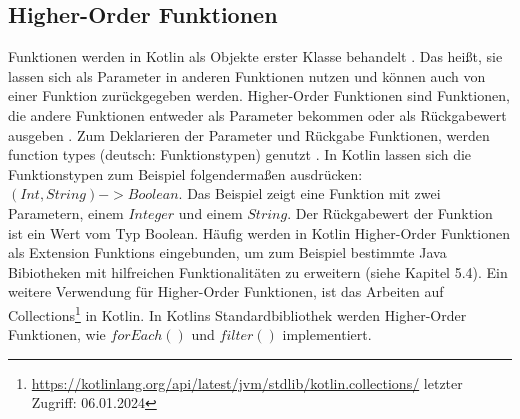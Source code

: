 \documentclass{article}
\begin{document}
\subsection{Higher-Order Funktionen}
Funktionen werden in Kotlin als Objekte erster Klasse behandelt \cite{KotlinLangDocHigherOrder}. Das heißt, sie lassen sich als Parameter in anderen Funktionen nutzen und können auch von einer Funktion zurückgegeben werden. Higher-Order Funktionen sind Funktionen, die andere Funktionen entweder als Parameter bekommen oder als Rückgabewert ausgeben \cite{KotlinLangDocHigherOrder}. Zum Deklarieren der Parameter und Rückgabe Funktionen, werden function types (deutsch: Funktionstypen) genutzt \cite{KotlinLangDocHigherOrder}. In Kotlin lassen sich die Funktionstypen zum Beispiel folgendermaßen ausdrücken: $(Int, String) -> Boolean$. Das Beispiel zeigt eine Funktion mit zwei Parametern, einem $Integer$ und einem $String$. Der Rückgabewert der Funktion ist ein Wert vom Typ Boolean. Häufig werden in Kotlin Higher-Order Funktionen als Extension Funktions eingebunden, um zum Beispiel bestimmte Java Bibiotheken mit hilfreichen Funktionalitäten zu erweitern (siehe Kapitel 5.4). Ein weitere Verwendung für Higher-Order Funktionen, ist das Arbeiten auf Collections\footnote{\url{https://kotlinlang.org/api/latest/jvm/stdlib/kotlin.collections/} letzter Zugriff: 06.01.2024} in Kotlin. In Kotlins Standardbibliothek werden Higher-Order Funktionen, wie $forEach()$ und $filter()$ implementiert.
\end{document}
